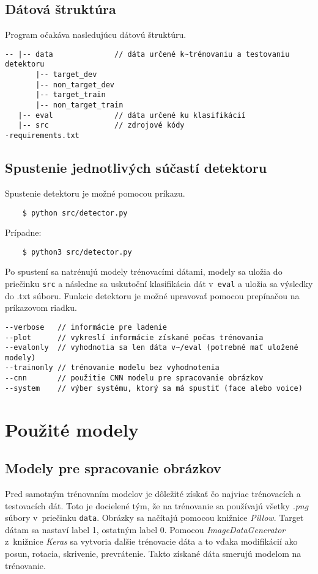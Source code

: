 \documentclass[11pt, a4paper]{article}
\begin{document}
		\subsection{Dátová štruktúra}
	Program očakáva nasledujúcu dátovú štruktúru.
			\begin{verbatim}
-- |-- data              // dáta určené k~trénovaniu a testovaniu detektoru
       |-- target_dev
       |-- non_target_dev
       |-- target_train
       |-- non_target_train
   |-- eval              // dáta určené ku klasifikácií
   |-- src               // zdrojové kódy 
-requirements.txt
			\end{verbatim}
			
		\subsection{Spustenie jednotlivých súčastí detektoru}
	Spustenie detektoru je možné pomocou príkazu.
			\begin{verbatim}
    $ python src/detector.py
			\end{verbatim}
	Prípadne:
			\begin{verbatim}
    $ python3 src/detector.py
			\end{verbatim}
	Po spustení sa natrénujú modely trénovacími dátami, modely sa uložia do priečinku \texttt{src} a následne sa uskutoční klasifikácia dát v~\texttt{eval} a uložia sa výsledky do .txt súboru.
	Funkcie detektoru je možné upravovať pomocou prepínačou na príkazovom riadku.
			\begin{verbatim}
--verbose   // informácie pre ladenie
--plot      // vykreslí informácie získané počas trénovania 
--evalonly  // vyhodnotia sa len dáta v~/eval (potrebné mať uložené modely)
--trainonly // trénovanie modelu bez vyhodnotenia
--cnn       // použitie CNN modelu pre spracovanie obrázkov
--system    // výber systému, ktorý sa má spustiť (face alebo voice)
			\end{verbatim}
	\section{Použité modely}
		\subsection{Modely pre spracovanie obrázkov}
		Pred samotným trénovaním modelov je dôležité získať čo najviac trénovacích a testovacích dát. Toto je docielené tým, že na trénovanie sa používajú všetky \emph{.png} súbory v~priečinku \texttt{data}. Obrázky sa načítajú pomocou knižnice \emph{Pillow}. Target dátam sa nastaví label 1, ostatným label 0. Pomocou \emph{ImageDataGenerator} z~knižnice \emph{Keras} sa vytvoria ďalšie trénovacie dáta a to vďaka modifikácií ako posun, rotacia, skrivenie, prevrátenie. Takto získané dáta smerujú modelom na trénovanie. 
\end{document}
